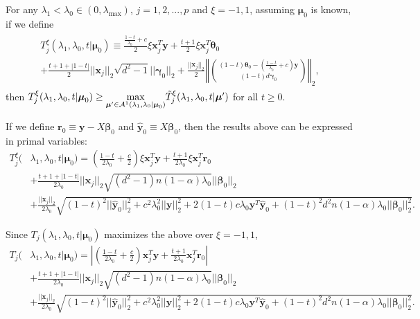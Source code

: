 \begin{theorem}
    \label{thm:2.1}
    For any $\lambda_1<\lambda_{0}\in (0,\lambda_\textrm{max})$, $j=1,2,...,p$ and $\xi=-1,1$, assuming $\boldsymbol\mu_0$ is known, if we define
    \begin{align}
        \begin{gathered}
            T^\xi_j(\lambda_1,\lambda_0,t|\boldsymbol\mu_0)\equiv\frac{\frac{1-t}{\lambda_0}+c}{2}\xi\boldsymbol x_j^T \boldsymbol y+\frac{t+1}{2}\xi \boldsymbol x_j^T \boldsymbol \theta_{0}\\+\frac{t+1+|1-t|}{2}||\boldsymbol x_j||_2\sqrt{d^2-1}||\boldsymbol\gamma_{0}||_2+\frac{||\boldsymbol x_j||_2}{2}\left\Vert\binom{(1-t)\boldsymbol\theta_{0}-\left(\frac{1-t}{\lambda_0}+c\right)\boldsymbol y}{(1-t)d\boldsymbol\gamma_{0}}\right\Vert_2,
        \end{gathered}
    \end{align}
    then $T^\xi_j(\lambda_1,\lambda_0,t|\boldsymbol\mu_0)\geq\underset{\boldsymbol\mu'\in\mathcal{A}^1(\lambda_1,\lambda_0|\boldsymbol\mu_0)}{\mathrm{max}}\Tilde{T}^\xi_j(\lambda_1,\lambda_0,t|\boldsymbol\mu')$ for all $t\geq0$.
\end{theorem}

If we define $\boldsymbol r_0\equiv \boldsymbol y-X\boldsymbol\beta_{0}$ and $\hat{\boldsymbol y}_{0}\equiv X\boldsymbol\beta_{0}$, then the results above can be expressed in primal variables:
\begin{align*}
    T^\xi_j(&\lambda_1,\lambda_0,t|\boldsymbol\mu_0)=  \left(\frac{1-t}{2\lambda_0}+\frac{c}{2}\right)\xi\boldsymbol x_j^T \boldsymbol y+\frac{t+1}{2\lambda_0}\xi \boldsymbol x_j^T \boldsymbol r_{0}\\
    &+\frac{t+1+|1-t|}{2\lambda_0}||\boldsymbol x_j||_2\sqrt{(d^2-1)n(1-\alpha) \lambda_0}||\boldsymbol\beta_{0}||_2\\
    &+\frac{||\boldsymbol x_j||_2}{2\lambda_0}\sqrt{(1-t)^2||\hat{\boldsymbol y}_{0}||_2^2+c^2\lambda_0^2||\boldsymbol y||_2^2+2(1-t)c\lambda_0 \boldsymbol y^T\hat{\boldsymbol y}_{0}+(1-t)^2d^2n(1-\alpha)\lambda_0||\boldsymbol\beta_{0}||_2^2}.
\end{align*}

Since $T_j(\lambda_1,\lambda_0,t|\boldsymbol\mu_0)$ maximizes the above over $\xi=-1,1$,
\begin{align}
    \label{eq:t}
    T_j(&\lambda_1,\lambda_0,t|\boldsymbol\mu_0)= \left| \left(\frac{1-t}{2\lambda_0}+\frac{c}{2}\right)\boldsymbol x_j^T \boldsymbol y+\frac{t+1}{2\lambda_0} \boldsymbol x_j^T \boldsymbol r_{0}\right|\\
    &+\frac{t+1+|1-t|}{2\lambda_0}||\boldsymbol x_j||_2\sqrt{(d^2-1)n(1-\alpha)\lambda_0 }||\boldsymbol\beta_{0}||_2\\
    &+\frac{||\boldsymbol x_j||_2}{2\lambda_0}\sqrt{(1-t)^2||\hat{\boldsymbol y}_{0}||_2^2+c^2\lambda_0^2||\boldsymbol y||_2^2+2(1-t)c\lambda_0 \boldsymbol y^T\hat{\boldsymbol y}_{0}+(1-t)^2d^2n(1-\alpha)\lambda_0||\boldsymbol\beta_{0}||_2^2}.
\end{align}

